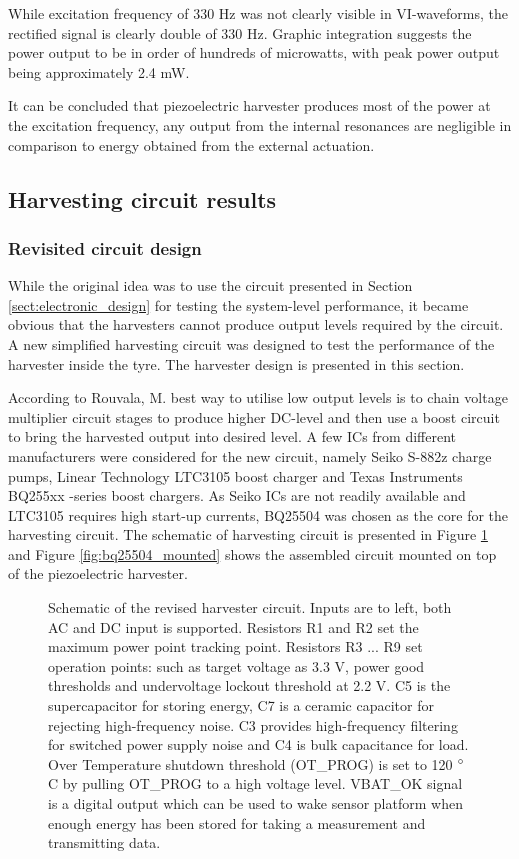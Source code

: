While excitation frequency of 330 Hz was not clearly visible in VI-waveforms, the rectified signal is clearly double of 330 Hz. Graphic integration suggests the power output to be in order of hundreds of microwatts, with peak power output being approximately 2.4 mW. 

It can be concluded that piezoelectric harvester produces most of the power at the excitation frequency, any output from the internal resonances are negligible in comparison to energy obtained from the external actuation.

\subsection{Harvesting circuit results}
\subsubsection{Revisited circuit design}\label{sect:BQ25504_schematic}
While the original idea was to use the circuit presented in Section \ref{sect:electronic_design} for testing the system-level performance, it became obvious that the harvesters cannot produce output levels required by the circuit. A new simplified harvesting circuit was designed to test the performance of the harvester inside the tyre. The harvester design is presented in this section.

According to Rouvala, M. \cite{Rouvala2015} best way to utilise low output levels is to chain voltage multiplier circuit stages to produce higher DC-level and then use a boost circuit to bring the harvested output into desired level. A few ICs from different manufacturers were considered for the new circuit, namely Seiko S-882z \cite{SeikoInstruments2010} charge pumps, Linear Technology LTC3105 \cite{ltc3015} boost charger and Texas Instruments BQ255xx -series boost chargers. As Seiko ICs are not readily available and LTC3105 requires high start-up currents, BQ25504 \cite{bq25504} was chosen as the core for the harvesting circuit. The schematic of harvesting circuit is presented in Figure \ref{fig:bq25504} and Figure \ref{fig:bq25504_mounted} shows the assembled circuit mounted on top of the piezoelectric harvester.


\begin{figure}[htb]
    \centering
    \def\svgwidth{\columnwidth}
    
    \caption{\label{fig:bq25504} Schematic of the revised harvester circuit. Inputs are to left, both AC and DC input is supported. Resistors R1 and R2 set the maximum power point tracking point. Resistors R3 ... R9 set operation points: such as target voltage as 3.3 V, power good thresholds and undervoltage lockout threshold at 2.2 V. C5 is the supercapacitor for storing energy, C7 is a ceramic capacitor for rejecting high-frequency noise. C3 provides high-frequency filtering for switched power supply noise and C4 is bulk capacitance for load. Over Temperature shutdown threshold (OT\_PROG) is set to 120 $\degree$C by pulling OT\_PROG to a high voltage level. VBAT\_OK signal is a digital output which can be used to wake sensor platform when enough energy has been stored for taking a measurement and transmitting data.}
\end{figure}

